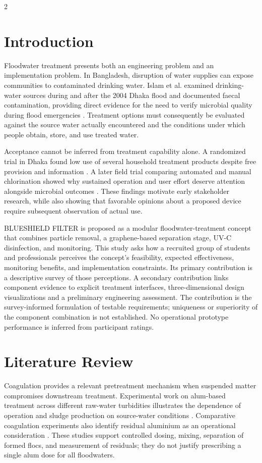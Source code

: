 \documentclass{ieeeaccess}
\begin{document}
\begin{multicols}{2}
\section{Introduction}

Floodwater treatment presents both an engineering problem and an implementation problem. In Bangladesh, disruption of water supplies can expose communities to contaminated drinking water. Islam et al. examined drinking-water sources during and after the 2004 Dhaka flood and documented faecal contamination, providing direct evidence for the need to verify microbial quality during flood emergencies \cite{r1}. Treatment options must consequently be evaluated against the source water actually encountered and the conditions under which people obtain, store, and use treated water.

Acceptance cannot be inferred from treatment capability alone. A randomized trial in Dhaka found low use of several household treatment products despite free provision and information \cite{r2}. A later field trial comparing automated and manual chlorination showed why sustained operation and user effort deserve attention alongside microbial outcomes \cite{r3}. These findings motivate early stakeholder research, while also showing that favorable opinions about a proposed device require subsequent observation of actual use.

BLUESHIELD FILTER is proposed as a modular floodwater-treatment concept that combines particle removal, a graphene-based separation stage, UV-C disinfection, and monitoring. This study asks how a recruited group of students and professionals perceives the concept's feasibility, expected effectiveness, monitoring benefits, and implementation constraints. Its primary contribution is a descriptive survey of those perceptions. A secondary contribution links component evidence to explicit treatment interfaces, three-dimensional design visualizations and a preliminary engineering assessment. The contribution is the survey-informed formulation of testable requirements; uniqueness or superiority of the component combination is not established. No operational prototype performance is inferred from participant ratings.

\section{Literature Review}

Coagulation provides a relevant pretreatment mechanism when suspended matter compromises downstream treatment. Experimental work on alum-based treatment across different raw-water turbidities illustrates the dependence of operation and sludge production on source-water conditions \cite{r4}. Comparative coagulation experiments also identify residual aluminium as an operational consideration \cite{r5}. These studies support controlled dosing, mixing, separation of formed flocs, and measurement of residuals; they do not justify prescribing a single alum dose for all floodwaters.


\end{multicols}
\end{document}
